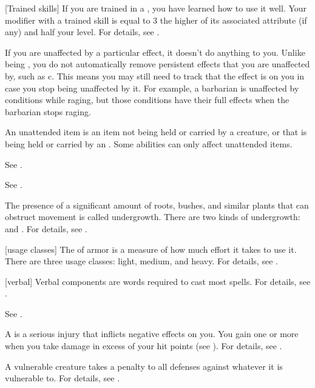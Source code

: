 
[Trained skills] If you are trained in a , you have learned how to use it well.
Your modifier with a trained skill is equal to 3 \add the higher of its associated attribute (if any) and half your level.
For details, see .

 If you are unaffected by a particular effect, it doesn't do anything to you.
Unlike being , you do not automatically remove persistent effects that you are unaffected by, such as c.
This means you may still need to track that the effect is on you in case you stop being unaffected by it.
For example, a barbarian is unaffected by conditions while raging, but those conditions have their full effects when the barbarian stops raging.

 An unattended item is an item not being held or carried by a creature, or that is being held or carried by an .
Some abilities can only affect unattended items.

 See .

 See .

 The presence of a significant amount of roots, bushes, and similar plants that can obstruct movement is called undergrowth.
There are two kinds of undergrowth:  and .
For details, see .

[usage classes] The  of armor is a measure of how much effort it takes to use it.
There are three usage classes: light, medium, and heavy.
For details, see .

[verbal] Verbal components are words required to cast most spells.
For details, see .

 See .

 A  is a serious injury that inflicts negative effects on you.
You gain one or more  when you take damage in excess of your hit points (see ).
For details, see .

 A vulnerable creature takes a  penalty to all defenses against whatever it is vulnerable to.
For details, see .


